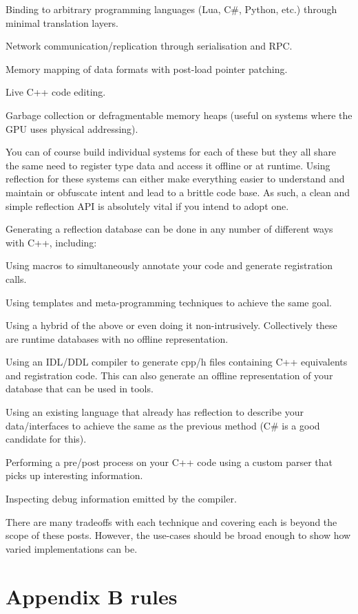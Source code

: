 \documentclass{book}
\begin{document}
    Binding to arbitrary programming languages (Lua, C\#, Python, etc.) through minimal translation layers.

    Network communication/replication through serialisation and RPC.

    Memory mapping of data formats with post-load pointer patching.

    Live C++ code editing.

    Garbage collection or defragmentable memory heaps (useful on systems where the GPU uses physical addressing).

You can of course build individual systems for each of these but they all share the same need to register type data and access it offline or at runtime.
Using reflection for these systems can either make everything easier to understand and maintain or obfuscate intent and lead to a brittle code base.
As such, a clean and simple reflection API is absolutely vital if you intend to adopt one.

Generating a reflection database can be done in any number of different ways with C++, including:

    Using macros to simultaneously annotate your code and generate registration calls.

    Using templates and meta-programming techniques to achieve the same goal.

    Using a hybrid of the above or even doing it non-intrusively. Collectively these are runtime databases with no offline representation.

    Using an IDL/DDL compiler to generate cpp/h files containing C++ equivalents and registration code. This can also generate an offline representation of your database that can be used in tools.

    Using an existing language that already has reflection to describe your data/interfaces to achieve the same as the previous method (C\# is a good candidate for this).

    Performing a pre/post process on your C++ code using a custom parser that picks up interesting information.

    Inspecting debug information emitted by the compiler.

There are many tradeoffs with each technique and covering each is beyond the scope of these posts. However, the use-cases should be broad enough to show how varied implementations can be.
\section{Appendix B rules}
\end{document}
